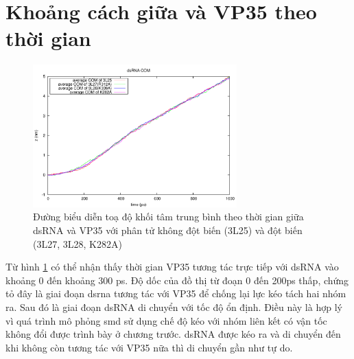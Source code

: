 \documentclass[12pt,a4paper,reqno, oneside]{book}
\begin{document}
\section{Khoảng cách giữa  và VP35 theo thời gian}
\label{distance}
\begin{figure}[h]
\centering
\includegraphics[width=0.7\textwidth,natwidth=610,natheight=642]{pullx}
\caption{Đường biểu diễn toạ độ khối tâm trung bình theo thời gian giữa dsRNA và VP35 với phân tử không đột biến (3L25) và đột biến (3L27, 3L28, \gls{K282A})}
\label{pullxt}
\end{figure}
Từ hình \ref{pullxt} có thể nhận thấy thời gian VP35 tương tác trực tiếp với dsRNA vào khoảng 0 đến khoảng 300 ps. Độ dốc của đồ thị từ đoạn 0 đến 200ps thấp, chứng tỏ đây là giai đoạn \gls{dsrna} tương tác với VP35 để chống lại lực kéo tách hai nhóm ra. Sau đó là giai đoạn dsRNA di chuyển với tốc độ ổn định. Điều này là hợp lý vì quá trình mô phỏng \gls{smd} sử dụng chế độ kéo với nhóm liên kết có vận tốc không đổi được trình bày ở chương trước. dsRNA được kéo ra và di chuyển đến khi không còn tương tác với VP35 nữa thì di chuyển gần như tự do.
\end{document}
